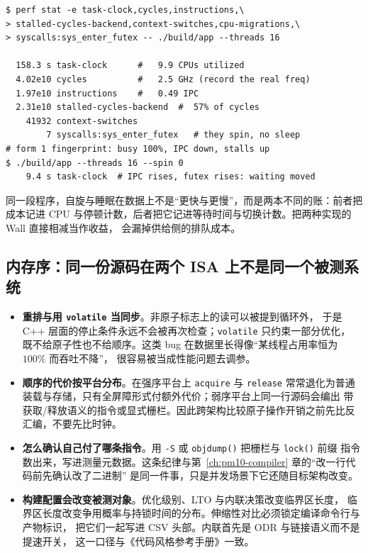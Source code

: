 \documentclass[12pt,a4paper,fontset=fandol]{ctexbook}
\newcommand{\Fn}[1]{\texttt{#1()}}
\newcommand{\Tp}[1]{\texttt{#1}}
\newcommand{\Lang}[1]{\textsf{#1}}
\newcommand{\CPP}{\Lang{C++}}
\newcommand{\MWall}{\Lang{Wall}}
\newcommand{\MCpu}{\Lang{CPU}}
\begin{document}
\begin{lstlisting}[style=outstyle, label={lst:pm09-spin},
caption={\Fn{perf} \Tp{stat} 与自研报告的示意输出/格式示例（非本仓库实测值）；事件名先用 \Fn{perf} \Tp{list} 确认。}]
$ perf stat -e task-clock,cycles,instructions,\
> stalled-cycles-backend,context-switches,cpu-migrations,\
> syscalls:sys_enter_futex -- ./build/app --threads 16

  158.3 s task-clock      #   9.9 CPUs utilized
  4.02e10 cycles          #   2.5 GHz (record the real freq)
  1.97e10 instructions    #   0.49 IPC
  2.31e10 stalled-cycles-backend  #  57% of cycles
    41932 context-switches
        7 syscalls:sys_enter_futex   # they spin, no sleep
# form 1 fingerprint: busy 100%, IPC down, stalls up
$ ./build/app --threads 16 --spin 0
    9.4 s task-clock  # IPC rises, futex rises: waiting moved
\end{lstlisting}

同一段程序，自旋与睡眠在数据上不是``更快与更慢''，而是两本不同的账：前者把成本记进 \MCpu{}
与停顿计数，后者把它记进等待时间与切换计数。把两种实现的 \MWall{} 直接相减当作收益，
会漏掉供给侧的排队成本。

\subsection{内存序：同一份源码在两个 ISA 上不是同一个被测系统}

\begin{itemize}
\item \textbf{重排与用 \Tp{volatile} 当同步}。非原子标志上的读可以被提到循环外，
      于是 \CPP{} 层面的停止条件永远不会被再次检查；\Tp{volatile} 只约束一部分优化，
      既不给原子性也不给顺序。这类 bug 在数据里长得像``某线程占用率恒为 $100\%$ 而吞吐不降''，
      很容易被当成性能问题去调参。
\item \textbf{顺序的代价按平台分布}。在强序平台上 \Tp{acquire} 与 \Tp{release}
      常常退化为普通装载与存储，只有全屏障形式付额外代价；弱序平台上同一行源码会编出
      带获取/释放语义的指令或显式栅栏。因此跨架构比较原子操作开销之前先比反汇编，不要先比时钟。
\item \textbf{怎么确认自己付了哪条指令}。用 \Tp{-S} 或 \Fn{objdump} 把栅栏与 \Fn{lock} 前缀
      指令数出来，写进测量元数据。这条纪律与第~\ref{ch:pm10-compiler} 章的``改一行代码前先确认改了二进制''
      是同一件事，只是并发场景下它还随目标架构改变。
\item \textbf{构建配置会改变被测对象}。优化级别、LTO 与内联决策改变临界区长度，
      临界区长度改变争用概率与持锁时间的分布。伸缩性对比必须锁定编译命令行与产物标识，
      把它们一起写进 CSV 头部。内联首先是 ODR 与链接语义而不是提速开关，
      这一口径与《代码风格参考手册》一致。
\end{itemize}
\end{document}
